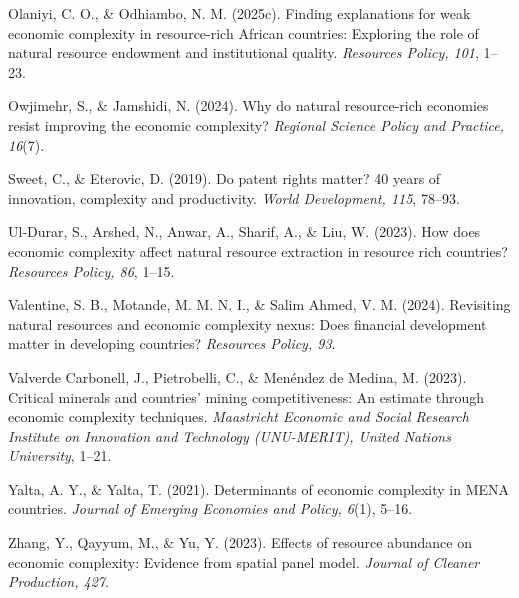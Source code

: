 \documentclass[12pt,a4paper]{article}
\begin{document}
\hangindent=1.27cm
Olaniyi, C. O., \& Odhiambo, N. M. (2025c). Finding explanations for weak economic complexity in resource-rich African countries: Exploring the role of natural resource endowment and institutional quality. \textit{Resources Policy, 101}, 1--23.

\hangindent=1.27cm
Owjimehr, S., \& Jamshidi, N. (2024). Why do natural resource-rich economies resist improving the economic complexity? \textit{Regional Science Policy and Practice, 16}(7).

\hangindent=1.27cm
Sweet, C., \& Eterovic, D. (2019). Do patent rights matter? 40 years of innovation, complexity and productivity. \textit{World Development, 115}, 78--93.

\hangindent=1.27cm
Ul-Durar, S., Arshed, N., Anwar, A., Sharif, A., \& Liu, W. (2023). How does economic complexity affect natural resource extraction in resource rich countries? \textit{Resources Policy, 86}, 1--15.

\hangindent=1.27cm
Valentine, S. B., Motande, M. M. N. I., \& Salim Ahmed, V. M. (2024). Revisiting natural resources and economic complexity nexus: Does financial development matter in developing countries? \textit{Resources Policy, 93}.

\hangindent=1.27cm
Valverde Carbonell, J., Pietrobelli, C., \& Menéndez de Medina, M. (2023). Critical minerals and countries' mining competitiveness: An estimate through economic complexity techniques. \textit{Maastricht Economic and Social Research Institute on Innovation and Technology (UNU-MERIT), United Nations University}, 1--21.

\hangindent=1.27cm
Yalta, A. Y., \& Yalta, T. (2021). Determinants of economic complexity in MENA countries. \textit{Journal of Emerging Economies and Policy, 6}(1), 5--16.

\hangindent=1.27cm
Zhang, Y., Qayyum, M., \& Yu, Y. (2023). Effects of resource abundance on economic complexity: Evidence from spatial panel model. \textit{Journal of Cleaner Production, 427}.

\endgroup
\end{document}

